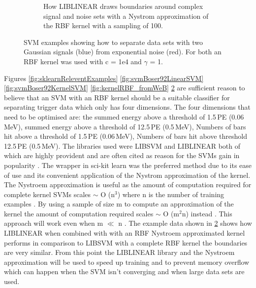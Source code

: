 \begin{figure}[htbp]
\begin{subfigure}{.5\textwidth}
  \captionsetup{width=.9\linewidth}
  \caption{How LIBLINEAR draws boundaries around complex signal and noise sets with a Nystrom approximation of the RBF kernel with a sampling of 100.}
  \label{subFig:exp_2NysGaussExample}
\end{subfigure}
\caption{SVM examples showing how to separate data sets with two Gaussian signals (blue) from exponential noise (red). For both an RBF kernel was used with c = 1e4 and $\gamma$ = 1.}
\label{fig:svmExp_GausseExamples}
\end{figure}

Figures \ref{fig:sklearnReleventExamples} \ref{fig:svmBoser92LinearSVM} \ref{fig:svmBoser92KernelSVM} \ref{fig:kernelRBF_fromWeB} \ref{fig:svmExp_GausseExamples} are sufficient reason to believe that an SVM with an RBF kernel should be a suitable classifier for separating trigger data which only has four dimensions. The four dimensions that need to be optimised are: the summed energy above a threshold of 1.5\,PE (0.06\,MeV), summed energy above a threshold of 12.5\,PE (0.5\,MeV), Numbers of bars hit above a threshold of 1.5\,PE (0.06\,MeV), Numbers of bars hit above threshold 12.5\,PE (0.5\,MeV). The libraries used were LIBSVM and LIBLINEAR both of which are highly provident and are often cited as reason for the SVMs gain in popularity \cite{chang2011libsvm} \cite{fan2008liblinear} \cite{murty2016support}. The wrapper in sci-kit learn was the preferred method due to its ease of use and its convenient application of the Nystrom approximation \cite{williams2001using} of the kernel. The Nystroem approximation is useful as the amount of computation required for complete kernel SVMs scales $\sim$ O (n$^3$) where n is the number of training examples \cite{williams2001using}. By using a sample of size m to compute an approximation of the kernel the amount of computation required scales $\sim$ O (m$^2$n) instead \cite{williams2001using}. This approach will work even when m $\ll$ n \cite{williams2001using}. The example data shown in \ref{fig:svmExp_GausseExamples} shows how LIBLINEAR when combined with with an RBF Nystroem approximated kernel performs in comparison to LIBSVM with a complete RBF kernel the boundaries are very similar. From this point the LIBLINEAR library and the Nystroem approximation will be used to speed up training and to prevent memory overflow which can happen when the SVM isn't converging and when large data sets are used. 
